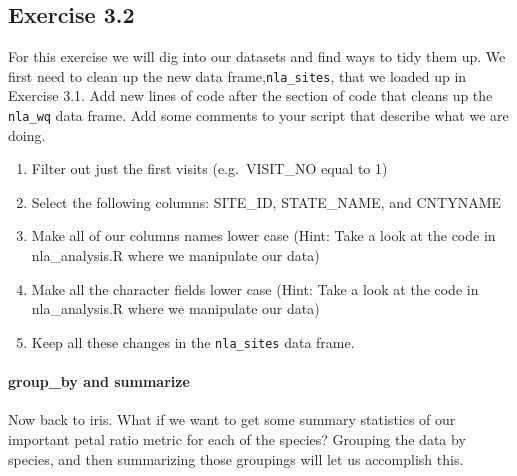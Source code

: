 \documentclass[]{article}
\newenvironment{Shaded}{\begin{snugshade}}{\end{snugshade}}
\newcommand{\DataTypeTok}[1]{\textcolor[rgb]{0.13,0.29,0.53}{#1}}
\newcommand{\KeywordTok}[1]{\textcolor[rgb]{0.13,0.29,0.53}{\textbf{#1}}}
\newcommand{\NormalTok}[1]{#1}
\newcommand{\OperatorTok}[1]{\textcolor[rgb]{0.81,0.36,0.00}{\textbf{#1}}}
\newcommand{\StringTok}[1]{\textcolor[rgb]{0.31,0.60,0.02}{#1}}
\providecommand{\tightlist}{%
  \setlength{\itemsep}{0pt}\setlength{\parskip}{0pt}}
\let\oldparagraph\paragraph
\renewcommand{\paragraph}[1]{\oldparagraph{#1}\mbox{}}
\begin{document}
\hypertarget{exercise-3.2}{%
\subsection{Exercise 3.2}\label{exercise-3.2}}

For this exercise we will dig into our datasets and find ways to tidy
them up. We first need to clean up the new data
frame,\texttt{nla\_sites}, that we loaded up in Exercise 3.1. Add new
lines of code after the section of code that cleans up the
\texttt{nla\_wq} data frame. Add some comments to your script that
describe what we are doing.

\begin{enumerate}
\def\labelenumi{\arabic{enumi}.}
\tightlist
\item
  Filter out just the first visits (e.g.~VISIT\_NO equal to 1)
\item
  Select the following columns: SITE\_ID, STATE\_NAME, and CNTYNAME
\item
  Make all of our columns names lower case (Hint: Take a look at the
  code in nla\_analysis.R where we manipulate our data)
\item
  Make all the character fields lower case (Hint: Take a look at the
  code in nla\_analysis.R where we manipulate our data)
\item
  Keep all these changes in the \texttt{nla\_sites} data frame.
\end{enumerate}

\hypertarget{group_by-and-summarize}{%
\paragraph{group\_by and summarize}\label{group_by-and-summarize}}

Now back to iris. What if we want to get some summary statistics of our
important petal ratio metric for each of the species? Grouping the data
by species, and then summarizing those groupings will let us accomplish
this.

\begin{Shaded}
\end{Shaded}
\end{document}

